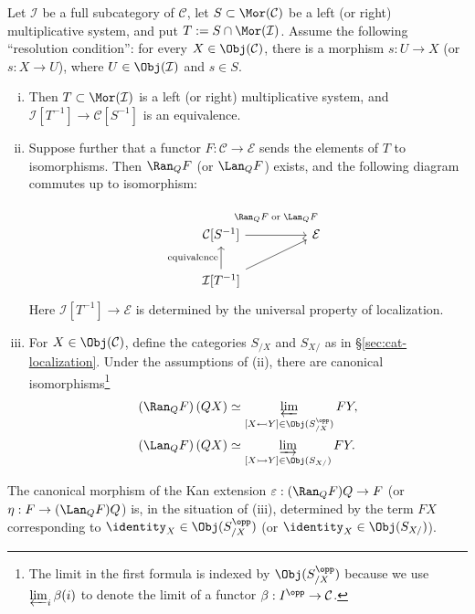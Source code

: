 \begin{proposition}\label{prop:injective-localization}
	Let $\mathcal{I}$ be a full subcategory of $\mathcal{C}$, let
	$S\subset\Mor(\mathcal{C})$ be a left (or right) multiplicative system,
	and put $T:=S\cap\Mor(\mathcal{I})$. Assume the following ``resolution
	condition'': for every $X\in\Obj(\mathcal{C})$, there is a morphism
	$s:U\to X$ (or $s:X\to U$), where $U\in\Obj(\mathcal{I})$ and $s\in S$.
	\begin{enumerate}[(i)]
		\item Then $T\subset\Mor(\mathcal{I})$ is a left (or right)
		multiplicative system, and
		$\mathcal{I}[T^{-1}]\to\mathcal{C}[S^{-1}]$ is an equivalence.
		\item Suppose further that a functor
		$F:\mathcal{C}\to\mathcal{E}$ sends the elements of $T$ to
		isomorphisms. Then $\Ran_QF$ (or $\Lan_QF$) exists, and the following
		diagram commutes up to isomorphism:
		\[\begin{tikzcd}[column sep=huge]
			\mathcal{C}[S^{-1}] \arrow[r, "{\Ran_Q F \;\text{or}\; \Lan_Q F }" inner sep=1em] & \mathcal{E} \\
			\mathcal{I}[T^{-1}] \arrow[u, "\text{equivalence}"] \arrow[ru]
		\end{tikzcd}\]
		Here $\mathcal{I}[T^{-1}]\to\mathcal{E}$ is determined by the universal
		property of localization.
		\item For $X\in\Obj(\mathcal{C})$, define the categories $S_{/X}$ and
		$S_{X/}$ as in \S\ref{sec:cat-localization}. Under the assumptions of
		(ii), there are canonical isomorphisms\footnote{The limit in the first
		formula is indexed by $\Obj(S_{/X}^{\opp})$ because we use
		$\varprojlim_i\beta(i)$ to denote the limit of a functor
		$\beta:I^{\opp}\to\mathcal{C}$.}
		\begin{align*}
			\left(\Ran_Q F\right)(QX) &\simeq \varprojlim_{[X \leftarrowtail Y] \in \Obj(S_{/X}^{\opp})} FY, \\
			\left(\Lan_Q F\right)(QX) &\simeq \varinjlim_{[X \rightarrowtail Y] \in \Obj(S_{X/})} FY.
		\end{align*}
	\end{enumerate}

	The canonical morphism of the Kan extension
	$\varepsilon:(\Ran_QF)Q\to F$ (or $\eta:F\to(\Lan_QF)Q$) is, in the
	situation of (iii), determined by the term $FX$ corresponding to
	$\identity_X\in\Obj(S_{/X}^{\opp})$ (or
	$\identity_X\in\Obj(S_{X/})$).
\end{proposition}
